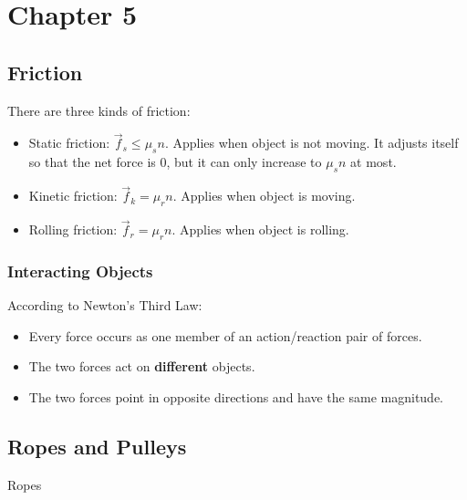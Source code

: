\section{Chapter 5}

\subsection{Friction}

There are three kinds of friction:

\begin{itemize}
    \item Static friction: $\Vec{f}_s \leq \mu_s n$. Applies when object is not moving. It adjusts itself so that the net force is 0, but it can only increase to $\mu_s n$ at most.
    \item Kinetic friction: $\Vec{f}_k = \mu_r n$. Applies when object is moving.
    \item Rolling friction: $\Vec{f}_r = \mu_r n$. Applies when object is rolling.
\end{itemize}

\subsubsection{Interacting Objects}

According to Newton's Third Law:

\begin{itemize}
    \item Every force occurs as one member of an action/reaction pair of forces.
    \item The two forces act on \textbf{different} objects.
    \item The two forces point in opposite directions and have the same magnitude.
\end{itemize}

\subsection{Ropes and Pulleys}

Ropes
